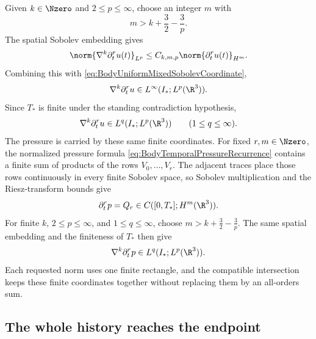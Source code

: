 Given \(k\in\Nzero\) and \(2\leq p\leq\infty\), choose an integer \(m\) with
\begin{equation}\label{eq:SobolevProjectionThreshold}
  m>k+\frac32-\frac3p.
\end{equation}
The spatial Sobolev embedding \parencite[Theorem~7.28]{Cerda2010} gives
\begin{equation}\label{eq:MasterSpatialProjection}
  \norm{\nabla^k\partial_t^ru(t)}_{L^p}
  \leq C_{k,m,p}\norm{\partial_t^ru(t)}_{H^m}.
\end{equation}
Combining this with \eqref{eq:BodyUniformMixedSobolevCoordinate},
\begin{equation}\label{eq:MasterUniformMixedEstimate}
  \nabla^k\partial_t^ru
  \in L^\infty(I_*;L^p(\R^3)).
\end{equation}
Since \(T_*\) is finite under the standing contradiction hypothesis,
\begin{equation}\label{eq:MasterFiniteTimeMixedEstimate}
  \nabla^k\partial_t^ru
  \in L^q(I_*;L^p(\R^3))
  \qquad(1\leq q\leq\infty).
\end{equation}
The pressure is carried by these same finite coordinates.
For fixed \(r,m\in\Nzero\), the normalized pressure formula \eqref{eq:BodyTemporalPressureRecurrence} contains a finite sum of products of the rows \(V_0,\ldots,V_r\).
The adjacent traces place those rows continuously in every finite Sobolev space, so Sobolev multiplication and the Riesz-transform bounds give
\begin{equation}\label{eq:MasterPressureSobolevCoordinate}
  \partial_t^rp=Q_r
  \in C([0,T_*];H^m(\R^3)).
\end{equation}
For finite \(k\), \(2\leq p\leq\infty\), and \(1\leq q\leq\infty\), choose \(m>k+\tfrac32-\tfrac3p\).
The same spatial embedding \parencite[Theorem~7.28]{Cerda2010} and the finiteness of \(T_*\) then give
\begin{equation}\label{eq:MasterFiniteTimePressureEstimate}
  \nabla^k\partial_t^rp
  \in L^q(I_*;L^p(\R^3)).
\end{equation}
Each requested norm uses one finite rectangle, and the compatible intersection keeps
these finite coordinates together without replacing them by an all-orders sum.

\subsection{The whole history reaches the endpoint}\label{sub:WholeHistoryReachesEndpoint}

